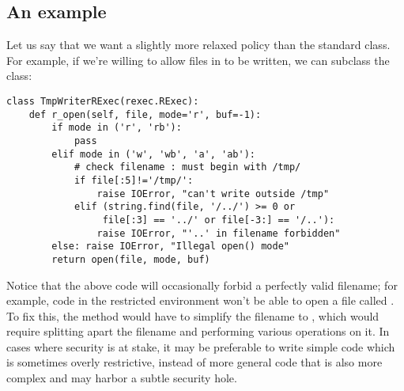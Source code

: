 \subsection{An example}

Let us say that we want a slightly more relaxed policy than the
standard  class.  For example, if we're willing to allow
files in  to be written, we can subclass the 
class:

\begin{verbatim}
class TmpWriterRExec(rexec.RExec):
    def r_open(self, file, mode='r', buf=-1):
        if mode in ('r', 'rb'):
            pass
        elif mode in ('w', 'wb', 'a', 'ab'):
            # check filename : must begin with /tmp/
            if file[:5]!='/tmp/': 
                raise IOError, "can't write outside /tmp"
            elif (string.find(file, '/../') >= 0 or
                 file[:3] == '../' or file[-3:] == '/..'):
                raise IOError, "'..' in filename forbidden"
        else: raise IOError, "Illegal open() mode"
        return open(file, mode, buf)
\end{verbatim}
%
Notice that the above code will occasionally forbid a perfectly valid
filename; for example, code in the restricted environment won't be
able to open a file called .  To fix this, the
 method would have to simplify the filename to
, which would require splitting apart the filename and
performing various operations on it.  In cases where security is at
stake, it may be preferable to write simple code which is sometimes
overly restrictive, instead of more general code that is also more
complex and may harbor a subtle security hole.
